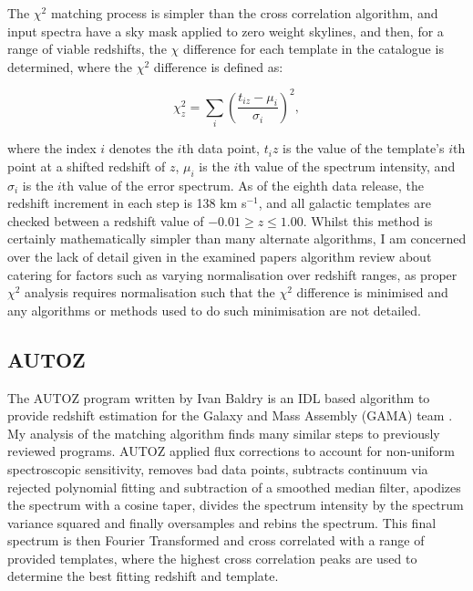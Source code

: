 \documentclass[titlesmallcaps, examinerscopy, copyrightpage]{uqthesis}
\begin{document}
The $\chi^2$ matching process is simpler than the cross correlation algorithm, and input spectra have a sky mask applied to zero weight skylines, and then, for a range of viable redshifts, the $\chi$ difference for each template in the catalogue is determined, where the $\chi^2$ difference is defined as:

\begin{equation}
\chi^2_z = \sum_i \left(\frac{t_{iz} - \mu_i}{\sigma_i} \right)^2,
\end{equation}

where the index $i$ denotes the $i$th data point, $t_iz$ is the value of the template's $i$th point at a shifted redshift of $z$, $\mu_i$ is the $i$th value of the spectrum intensity, and $\sigma_i$ is the $i$th value of the error spectrum. As of the eighth data release, the redshift increment in each step is 138 km s$^{-1}$, and all galactic templates are checked between a redshift value of $-0.01 \geq z \leq 1.00$. Whilst this method is certainly mathematically simpler than many alternate algorithms, I am concerned over the lack of detail given in the examined papers algorithm review about catering for factors such as varying normalisation over redshift ranges, as proper $\chi^2$ analysis requires normalisation such that the $\chi^2$ difference is minimised and any algorithms or methods used to do such minimisation are not detailed.



\subsection{\textsc{AUTOZ}}

The \textsc{AUTOZ} program written by Ivan Baldry is an IDL based algorithm to provide redshift estimation for the Galaxy and Mass Assembly (GAMA) team \cite{baldry2014galaxy}. My analysis of the matching algorithm finds many similar steps to previously reviewed programs. \textsc{AUTOZ} applied flux corrections to account for non-uniform spectroscopic sensitivity, removes bad data points, subtracts continuum via rejected polynomial fitting and subtraction of a smoothed median filter, apodizes the spectrum with a cosine taper, divides the spectrum intensity by the spectrum variance squared and finally oversamples and rebins the spectrum. This final spectrum is then Fourier Transformed and cross correlated with a range of provided templates, where the highest cross correlation peaks are used to determine the best fitting redshift and template.
\end{document}
